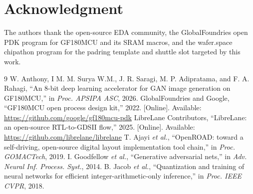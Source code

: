 \documentclass[conference,a4paper]{APSIPA2026}
\begin{document}
\section*{Acknowledgment}
The authors thank the open-source EDA community, the GlobalFoundries open PDK program for GF180MCU and its SRAM macros, and the wafer.space chipathon program for the padring template and shuttle slot targeted by this work.

\begin{thebibliography}{9}
 W. Anthony, I M. M. Surya W.M., J. R. Saragi, M. P. Adipratama, and F. A. Rahagi, ``An 8-bit deep learning accelerator for GAN image generation on GF180MCU,'' in \emph{Proc. APSIPA ASC}, 2026.
 GlobalFoundries and Google, ``GF180MCU open process design kit,'' 2022. [Online]. Available: \url{https://github.com/google/gf180mcu-pdk}
 LibreLane Contributors, ``LibreLane: an open-source RTL-to-GDSII flow,'' 2025. [Online]. Available: \url{https://github.com/librelane/librelane}
 T. Ajayi \emph{et al.}, ``OpenROAD: toward a self-driving, open-source digital layout implementation tool chain,'' in \emph{Proc. GOMACTech}, 2019.
 I. Goodfellow \emph{et al.}, ``Generative adversarial nets,'' in \emph{Adv. Neural Inf. Process. Syst.}, 2014.
 B. Jacob \emph{et al.}, ``Quantization and training of neural networks for efficient integer-arithmetic-only inference,'' in \emph{Proc. IEEE CVPR}, 2018.
\end{thebibliography}
\end{document}

